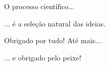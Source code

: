 \documentclass{beamer}
\begin{document}
\begin{frame}
  \begin{center}
    O processo científico...

    \bigskip
    \bigskip
    ... é a seleção natural das ideias.
  \end{center}
\end{frame}

\begin{frame}
  \begin{center}
    Obrigado por tudo! Até mais...

    \bigskip
    \bigskip
    ... e obrigado pelo peixe!
  \end{center}
\end{frame}
\end{document}
